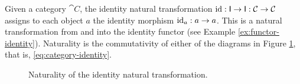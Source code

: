 \begin{example}
  \label{ex:natural-identity}

  Given a category $\cat{C}$, the identity natural transformation
  $\operatorname{id}: \mathsf{I} \to \mathsf{I}: \mathcal{C} \to \mathcal{C}$ assigns to each
  object $a$ the identity morphism $\operatorname{id}_{a}: a \to a$. This is a
  natural transformation from and into the identity functor (see
  Example \ref{ex:functor-identity}). Naturality is the commutativity
  of either of the diagrams in Figure \ref{fig:natural-identity}, that
  is, \eqref{eq:category-identity}.

  \begin{figure}[htb]
    \begin{center}
      \begin{subfigure}[t]{0.45\linewidth}
        \begin{center}
        \end{center}
      \end{subfigure}
      \begin{subfigure}[t]{0.45\linewidth}
        \begin{center}
        \end{center}
      \end{subfigure}
    \end{center}
    \caption{Naturality of the identity natural transformation.}
    \label{fig:natural-identity}
  \end{figure}

\end{example}

